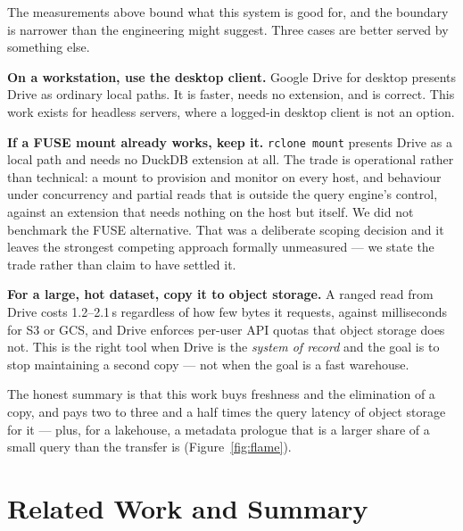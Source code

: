 \documentclass[sigconf, nonacm]{acmart}
\begin{document}
The measurements above bound what this system is good for, and the boundary is
narrower than the engineering might suggest. Three cases are better served by
something else.

\textbf{On a workstation, use the desktop client.} Google Drive for desktop
presents Drive as ordinary local paths. It is faster, needs no extension, and
is correct. This work exists for headless servers, where a logged-in desktop
client is not an option.

\textbf{If a FUSE mount already works, keep it.} \texttt{rclone mount} presents
Drive as a local path and needs no DuckDB extension at all. The trade is
operational rather than technical: a mount to provision and monitor on every
host, and behaviour under concurrency and partial reads that is outside the
query engine's control, against an extension that needs nothing on the host but
itself. We did not benchmark the FUSE alternative. That was a deliberate
scoping decision and it leaves the strongest competing approach formally
unmeasured --- we state the trade rather than claim to have settled it.

\textbf{For a large, hot dataset, copy it to object storage.} A ranged read
from Drive costs 1.2--2.1\,s regardless of how few bytes it requests, against
milliseconds for S3 or GCS, and Drive enforces per-user API quotas that object
storage does not. This is the right tool when Drive is the \emph{system of
record} and the goal is to stop maintaining a second copy --- not when the goal
is a fast warehouse.

The honest summary is that this work buys freshness and the elimination of a
copy, and pays two to three and a half times the query latency of object
storage for it --- plus, for a lakehouse, a metadata prologue that is a larger
share of a small query than the transfer is
(Figure~\ref{fig:flame}).

\section{Related Work and Summary}
\label{sec:related}
\end{document}
